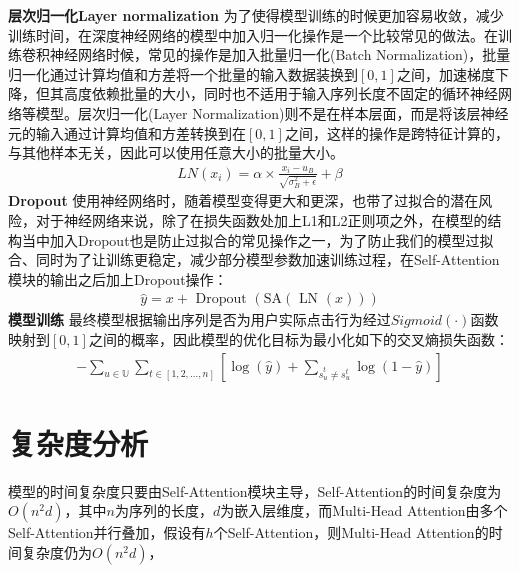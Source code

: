 \textbf{层次归一化Layer normalization}
为了使得模型训练的时候更加容易收敛，减少训练时间，在深度神经网络的模型中加入归一化操作是一个比较常见的做法。在训练卷积神经网络时候，常见的操作是加入批量归一化(Batch Normalization)，批量归一化通过计算均值和方差将一个批量的输入数据装换到$[0,1]$之间，加速梯度下降，但其高度依赖批量的大小，同时也不适用于输入序列长度不固定的循环神经网络等模型。层次归一化(Layer Normalization)则不是在样本层面，而是将该层神经元的输入通过计算均值和方差转换到在$[0,1]$之间，这样的操作是跨特征计算的，与其他样本无关，因此可以使用任意大小的批量大小。
\begin{align}
	LN(x_i)=\alpha\times\frac{x_i-u_B}{\sqrt{\sigma_B^2+\epsilon}}+\beta
\end{align}
\textbf{Dropout}
使用神经网络时，随着模型变得更大和更深，也带了过拟合的潜在风险，对于神经网络来说，除了在损失函数处加上L1和L2正则项之外，在模型的结构当中加入Dropout也是防止过拟合的常见操作之一，为了防止我们的模型过拟合、同时为了让训练更稳定，减少部分模型参数加速训练过程，在Self-Attention模块的输出之后加上Dropout操作：
\begin{align}
	\hat{y}=x+\text { Dropout }(\text {SA}(\text { LN }(x)))
\end{align}
\textbf{模型训练}
最终模型根据输出序列是否为用户实际点击行为经过$Sigmoid(\cdot )$函数映射到$[0,1]$之间的概率，因此模型的优化目标为最小化如下的交叉熵损失函数：
\begin{align}
-\sum_{{u} \in \mathbb{U}} \sum_{t \in[1,2, \ldots, n]}\left[\log (\hat{y})+\sum_{\hat{s}_{u}^{t}\neq s_{u}^{t}} \log (1-\hat{y})\right]
\end{align}


\section{复杂度分析}

模型的时间复杂度只要由Self-Attention模块主导，Self-Attention的时间复杂度为$O(n^{2} d)$，其中$n$为序列的长度，$d$为嵌入层维度，而Multi-Head Attention由多个Self-Attention并行叠加，假设有$h$个Self-Attention，则Multi-Head Attention的时间复杂度仍为$O(n^{2} d)$，




